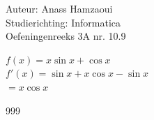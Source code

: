 \documentclass[a4paper]{article}
\begin{document}
  
\noindent \large Auteur: Anass Hamzaoui \\
\noindent \large Studierichting: Informatica \\
\noindent \large Oefeningenreeks 3A nr. 10.9\\

\medskip

\normalsize

$f(x) = x\sin x + \cos x$ \\

$f'(x) = \sin x + x\cos x - \sin x $\\

$= x\cos x $\\

\begin{thebibliography}{999}
\end{thebibliography}
\end{document}
